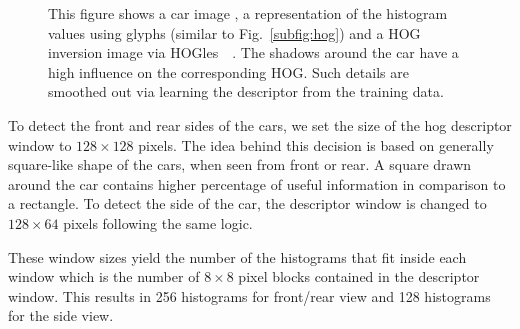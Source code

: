 \begin{figure}[b]
 \centering
{} \hspace{3mm}
 \hspace{3mm}
\caption{This figure shows a car image , a representation of the histogram values using glyphs (similar to Fig.~\ref{subfig:hog})  and a HOG inversion image via HOGles~\cite{vondrick2013hoggles}~. The shadows around the car have a high influence on the corresponding HOG. Such details are smoothed out via learning the descriptor from the training data.}
\label{fig:hog_car}
\end{figure}

To detect the front and rear sides of the cars, we set the size of the hog
descriptor window to $128 \times 128$ pixels. The idea behind this decision is
based on generally square-like shape of the cars, when seen from front or
rear. A square drawn around the car contains higher percentage of useful
information in comparison to a rectangle. To detect the side of the car, the
descriptor window is changed to $128 \times 64$ pixels following the same
logic.

These window sizes yield the number of the histograms that fit inside each
window which is the number of $8 \times 8$ pixel blocks contained in the
descriptor window. This results in 256 histograms for front/rear view and 128
histograms for the side view.

